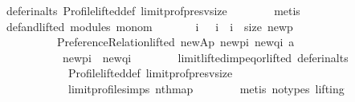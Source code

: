 \begin{isabellebody}
\ defer{\isacharunderscore}{\kern0pt}in{\isacharunderscore}{\kern0pt}alts\ Profile{\isachardot}{\kern0pt}lifted{\isacharunderscore}{\kern0pt}def\ limit{\isacharunderscore}{\kern0pt}prof{\isacharunderscore}{\kern0pt}presv{\isacharunderscore}{\kern0pt}size\isanewline
\ \ \ \ \ \ \isamarkupfalse%
\ metis\isanewline
\ \ \ \ \isamarkupfalse%
\ def{\isacharunderscore}{\kern0pt}and{\isacharunderscore}{\kern0pt}lifted\ modules\ mono{\isacharunderscore}{\kern0pt}m\ \isamarkupfalse%
\isanewline
\ \ \ \ \ \ {\isachardoublequoteopen}{\isasymforall}i{\isachardot}{\kern0pt}\ {\isacharparenleft}{\kern0pt}{}\ {\isasymle}\ i\ {\isasymand}\ i\ {\isacharless}{\kern0pt}\ size\ {\isacharquery}{\kern0pt}new{\isacharunderscore}{\kern0pt}p{\isacharparenright}{\kern0pt}\ {\isasymlongrightarrow}\isanewline
\ \ \ \ \ \ \ \ \ \ {\isacharparenleft}{\kern0pt}Preference{\isacharunderscore}{\kern0pt}Relation{\isachardot}{\kern0pt}lifted\ {\isacharquery}{\kern0pt}new{\isacharunderscore}{\kern0pt}Ap\ {\isacharparenleft}{\kern0pt}{\isacharquery}{\kern0pt}new{\isacharunderscore}{\kern0pt}p{\isacharbang}{\kern0pt}i{\isacharparenright}{\kern0pt}\ {\isacharparenleft}{\kern0pt}{\isacharquery}{\kern0pt}new{\isacharunderscore}{\kern0pt}q{\isacharbang}{\kern0pt}i{\isacharparenright}{\kern0pt}\ a\ {\isasymor}\isanewline
\ \ \ \ \ \ \ \ \ \ \ {\isacharparenleft}{\kern0pt}{\isacharquery}{\kern0pt}new{\isacharunderscore}{\kern0pt}p{\isacharbang}{\kern0pt}i{\isacharparenright}{\kern0pt}\ {\isacharequal}{\kern0pt}\ {\isacharparenleft}{\kern0pt}{\isacharquery}{\kern0pt}new{\isacharunderscore}{\kern0pt}q{\isacharbang}{\kern0pt}i{\isacharparenright}{\kern0pt}{\isacharparenright}{\kern0pt}{\isachardoublequoteclose}\isanewline
\ \ \ \ \ \ \isamarkupfalse%
\ limit{\isacharunderscore}{\kern0pt}lifted{\isacharunderscore}{\kern0pt}imp{\isacharunderscore}{\kern0pt}eq{\isacharunderscore}{\kern0pt}or{\isacharunderscore}{\kern0pt}lifted\ defer{\isacharunderscore}{\kern0pt}in{\isacharunderscore}{\kern0pt}alts\isanewline
\ \ \ \ \ \ \ \ \ \ \ \ Profile{\isachardot}{\kern0pt}lifted{\isacharunderscore}{\kern0pt}def\ limit{\isacharunderscore}{\kern0pt}prof{\isacharunderscore}{\kern0pt}presv{\isacharunderscore}{\kern0pt}size\isanewline
\ \ \ \ \ \ \ \ \ \ \ \ limit{\isacharunderscore}{\kern0pt}profile{\isachardot}{\kern0pt}simps\ nth{\isacharunderscore}{\kern0pt}map\isanewline
\ \ \ \ \ \ \isamarkupfalse%
\ {\isacharparenleft}{\kern0pt}metis\ {\isacharparenleft}{\kern0pt}no{\isacharunderscore}{\kern0pt}types{\isacharcomma}{\kern0pt}\ lifting{\isacharparenright}{\kern0pt}{\isacharparenright}{\kern0pt}\isanewline

\end{isabellebody}
